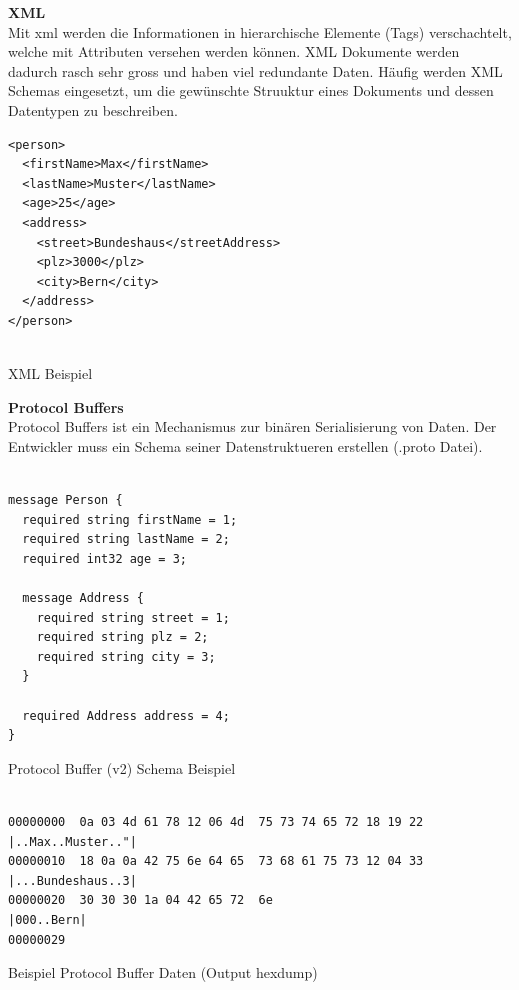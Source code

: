 \textbf{XML} \\
Mit \gls{xml} werden die Informationen in hierarchische Elemente (Tags) verschachtelt, welche mit Attributen versehen werden können. XML Dokumente werden dadurch rasch sehr gross und haben viel redundante Daten. Häufig werden XML Schemas eingesetzt, um die gewünschte Struuktur eines Dokuments und dessen Datentypen zu beschreiben.

\begin{listing}[H]
\begin{verbatim}
<person>
  <firstName>Max</firstName>
  <lastName>Muster</lastName>
  <age>25</age>
  <address>
    <street>Bundeshaus</streetAddress>
    <plz>3000</plz>
    <city>Bern</city>
  </address>
</person>


\end{verbatim}
\caption{XML Beispiel}
\end{listing}



\textbf{Protocol Buffers} \\
Protocol Buffers ist ein Mechanismus zur binären Serialisierung von Daten. Der Entwickler muss ein Schema seiner Datenstruktueren erstellen (.proto Datei).

\begin{listing}[H]
\begin{verbatim}

message Person {
  required string firstName = 1;
  required string lastName = 2;
  required int32 age = 3;

  message Address {
    required string street = 1;
    required string plz = 2;
    required string city = 3;
  }
  
  required Address address = 4;
}

\end{verbatim}
\caption{Protocol Buffer (v2) Schema Beispiel}
\end{listing}


\begin{listing}[H]
\begin{verbatim}
               
00000000  0a 03 4d 61 78 12 06 4d  75 73 74 65 72 18 19 22  |..Max..Muster.."|
00000010  18 0a 0a 42 75 6e 64 65  73 68 61 75 73 12 04 33  |...Bundeshaus..3|
00000020  30 30 30 1a 04 42 65 72  6e                       |000..Bern|
00000029

\end{verbatim}
\caption{Beispiel Protocol Buffer Daten (Output hexdump)}
\end{listing}


